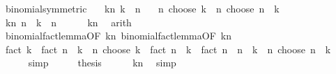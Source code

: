 \begin{isabellebody}
%
\endisadelimproof
\isanewline
{}\isamarkupfalse%
\ binomial{\isacharunderscore}{\kern0pt}symmetric{\isacharcolon}{\kern0pt}\isanewline
\ \ \ kn{\isacharcolon}{\kern0pt}\ {\isachardoublequoteopen}k\ {\isasymle}\ n{\isachardoublequoteclose}\isanewline
\ \ \ {\isachardoublequoteopen}n\ choose\ k\ {\isacharequal}{\kern0pt}\ n\ choose\ {\isacharparenleft}{\kern0pt}n\ {\isacharminus}{\kern0pt}\ k{\isacharparenright}{\kern0pt}{\isachardoublequoteclose}\isanewline
%
\isadelimproof
%
\endisadelimproof
%
\isatagproof
{}\isamarkupfalse%
\ {\isacharminus}{\kern0pt}\isanewline
\ \ \isamarkupfalse%
\ kn{\isacharprime}{\kern0pt}{\isacharcolon}{\kern0pt}\ {\isachardoublequoteopen}n\ {\isacharminus}{\kern0pt}\ k\ {\isasymle}\ n{\isachardoublequoteclose}\isanewline
\ \ \ \ \isamarkupfalse%
\ kn\ \isamarkupfalse%
\ arith\isanewline
\ \ \isamarkupfalse%
\ binomial{\isacharunderscore}{\kern0pt}fact{\isacharunderscore}{\kern0pt}lemma{\isacharbrackleft}{\kern0pt}OF\ kn{\isacharbrackright}{\kern0pt}\ binomial{\isacharunderscore}{\kern0pt}fact{\isacharunderscore}{\kern0pt}lemma{\isacharbrackleft}{\kern0pt}OF\ kn{\isacharprime}{\kern0pt}{\isacharbrackright}{\kern0pt}\isanewline
\ \ \isamarkupfalse%
\ {\isachardoublequoteopen}fact\ k\ {\isacharasterisk}{\kern0pt}\ fact\ {\isacharparenleft}{\kern0pt}n\ {\isacharminus}{\kern0pt}\ k{\isacharparenright}{\kern0pt}\ {\isacharasterisk}{\kern0pt}\ {\isacharparenleft}{\kern0pt}n\ choose\ k{\isacharparenright}{\kern0pt}\ {\isacharequal}{\kern0pt}\ fact\ {\isacharparenleft}{\kern0pt}n\ {\isacharminus}{\kern0pt}\ k{\isacharparenright}{\kern0pt}\ {\isacharasterisk}{\kern0pt}\ fact\ {\isacharparenleft}{\kern0pt}n\ {\isacharminus}{\kern0pt}\ {\isacharparenleft}{\kern0pt}n\ {\isacharminus}{\kern0pt}\ k{\isacharparenright}{\kern0pt}{\isacharparenright}{\kern0pt}\ {\isacharasterisk}{\kern0pt}\ {\isacharparenleft}{\kern0pt}n\ choose\ {\isacharparenleft}{\kern0pt}n\ {\isacharminus}{\kern0pt}\ k{\isacharparenright}{\kern0pt}{\isacharparenright}{\kern0pt}{\isachardoublequoteclose}\isanewline
\ \ \ \ \isamarkupfalse%
\ simp\isanewline
\ \ \isamarkupfalse%
\ \isamarkupfalse%
\ {\isacharquery}{\kern0pt}thesis\isanewline
\ \ \ \ \isamarkupfalse%
\ kn\ \isamarkupfalse%
\ simp\isanewline
{}\isamarkupfalse%
%
\endisatagproof
{\isafoldproof}%
%
\isadelimproof
\isanewline
%
\endisadelimproof
\isanewline
{}\isamarkupfalse%

\end{isabellebody}

